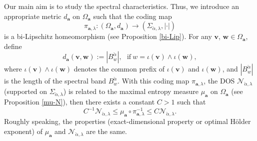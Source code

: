 \documentclass[reqno,11pt,graphicx,]{amsart}
\numberwithin{equation}{section}
\theoremstyle{plain}
\newcommand{\3}{\mathbf{3}}
\newcommand{\ma}{\mathbf{a}}
\newcommand{\mv}{\mathbf{v}}
\begin{document}
	Our main aim is to study the spectral characteristics. Thus, we introduce an appropriate metric $d_{\ma}$ on $\Omega_{\ma}$ such that the coding map
	\begin{equation}\label{bi-lip-hom}
		\pi_{\ma,\lambda}:(\Omega_{\ma},d_{\ma})\to(\Sigma_{\check{\alpha},\lambda},|\cdot|)
	\end{equation}
	is a bi-Lipschitz homeomorphism (see Proposition \ref{bi-Lip}).
	For any $\mv$, $\mathbf{w}\in \Omega_{\ma}$, define
	\begin{equation*}
		d_{\ma}(\mv,\mathbf{w}):=|B^{\check{\alpha}}_{w}|,\ \ \ \text{if}\ w=\iota(\mv)\wedge\iota(\mathbf{w}),
	\end{equation*}
	where $\iota(\mv)\wedge\iota(\mathbf{w})$ denotes the common prefix of $\iota(\mv)$ and $\iota(\mathbf{w})$, and $|B^{\check{\alpha}}_w|$ is the length of the spectral band $B^{\check{\alpha}}_w$. 
	With this coding map $\pi_{\ma,\lambda}$, the DOS $\mathcal{N}_{\check{\alpha},\lambda}$ (supported on $\Sigma_{\check{\alpha},\lambda}$) is related to the maximal entropy measure $\mu_{\ma}$ on $\Omega_{\ma}$ (see Proposition \ref{mu-N}), %
	then there exists a constant $C>1$ such that
	\begin{equation}\label{id-1}
		C^{-1}\mathcal{N}_{\check{\alpha},\lambda}\leq 	\mu_{\ma}\circ\pi^{-1}_{\ma,\lambda}\leq C\mathcal{N}_{\check{\alpha},\lambda}.
	\end{equation}
	Roughly speaking, the properties (exact-dimensional property or optimal H\"older exponent) of $\mu_{\ma}$ and $\mathcal{N}_{\check{\alpha},\lambda}$ are the same.
	
\end{document}
